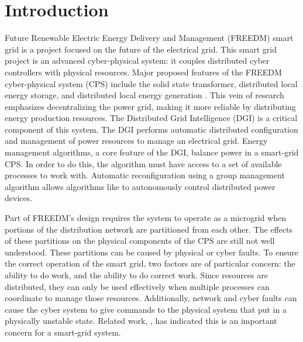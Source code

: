 
\section{Introduction}

 Future Renewable Electric Energy Delivery and Management (FREEDM) smart grid is a project focused on the future of the electrical grid.
This smart grid project is an advanced cyber-physical system: it couples distributed cyber controllers with physical resources.
Major proposed features of the FREEDM cyber-physical system (CPS) include the solid state transformer, distributed local energy storage, and distributed local energy generation \cite{FREEDMMIGRATION}.
This vein of research emphasizes decentralizing the power grid, making it more reliable by distributing energy production resources.
The Distributed Grid Intelligence (DGI) is a critical component of this system.
The DGI performs automatic distributed configuration and management of power resources to manage an electrical grid.
Energy management algorithms, a core feature of the DGI\cite{LOADBALANCING}, balance power in a smart-grid CPS.
In order to do this, the algorithm must have access to a set of available processes to work with.
Automatic reconfiguration using a group management algorithm allows algorithms like \cite{LOADBALANCING}\cite{ICC1}\cite{MOYEEN} to autonomously control distributed power devices.

Part of FREEDM's design requires the system to operate as a microgrid when portions of the distribution network are partitioned from each other.
The effects of these partitions on the physical components of the CPS are still not well understood.
These partitions can be caused by physical or cyber faults.
To ensure the correct operation of the smart grid, two factors are of particular concern: the ability to do work, and the ability to do correct work.
Since resources are distributed, they can only be used effectively when multiple processes can coordinate to manage those resources.
Additionally, network and cyber faults can cause the cyber system to give commands to the physical system that put in a physically unstable state.
Related work, \cite{HARINI}\cite{TSG}\cite{ICC2}\cite{SGNETFAULT}, has indicated this is an important concern for a smart-grid system.

